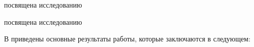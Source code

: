 посвящена исследованию 

 посвящена исследованию 

В  приведены основные результаты работы, которые заключаются в следующем:






